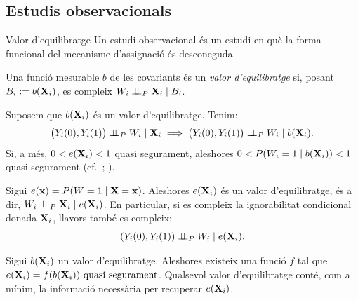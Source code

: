 \documentclass{bestbeamer}
\begin{document}
\subsection{Estudis observacionals}
\begin{frame}[allowframebreaks]{Valor d'equilibratge}
Un estudi observacional és un estudi en què la forma funcional del mecanisme d'assignació és desconeguda.
\begin{definition}\label{def:valor-equilibratge}
Una funció mesurable $b$ de les covariants és un \emph{valor d'equilibratge} si, posant $B_i:=b(\mathbf{X}_i)$, es compleix $W_i\perp\!\!\!\perp_P \mathbf{X}_i \mid B_i$.
\end{definition}
\begin{prop}\label{prop:equilibratge-ignorabilitat}
Suposem que $b(\mathbf{X}_i)$ és un valor d'equilibratge. Tenim:
\begin{equation*}
\bigl(Y_i(0),Y_i(1)\bigr)\perp\!\!\!\perp_P W_i\mid \mathbf{X}_i\implies \bigl(Y_i(0),Y_i(1)\bigr)\perp\!\!\!\perp_P W_i\mid b(\mathbf{X}_i).
\end{equation*}
Si, a més, $0<e(\mathbf{X}_i)<1$ quasi segurament, aleshores $0<P(W_i=1\mid b(\mathbf{X}_i))<1$ quasi segurament (cf.~{\cite[Th.~3]{rosenbaum1983}}; {\cite[Technical Point~15.1]{hernan2024causal}}).
\end{prop}
\begin{prop}\label{prop:propensio-equilibratge}
Sigui $e(\mathbf{x})=P(W=1\mid \mathbf{X}=\mathbf{x})$. Aleshores $e(\mathbf{X}_i)$ és un valor d'equilibratge, és a dir, $W_i\perp\!\!\!\perp_P \mathbf{X}_i\mid e(\mathbf{X}_i)$. En particular, si es compleix la ignorabilitat condicional donada $\mathbf{X}_i$, llavors també es compleix:
\begin{equation*}
\left(Y_i(0),Y_i(1)\right)\perp\!\!\!\perp_P W_i\mid e(\mathbf{X}_i).
\end{equation*}
\end{prop}
\begin{prop}\label{prop:propensio-menys-fi}
Sigui $b(\mathbf{X}_i)$ un valor d'equilibratge. Aleshores existeix una funció $f$ tal que $e(\mathbf{X}_i)=f(b(\mathbf{X}_i))\ \text{quasi segurament}$. Qualsevol valor d'equilibratge conté, com a mínim, la informació necessària per recuperar $e(\mathbf{X}_i)$.
\end{prop}
\end{frame}
\end{document}
